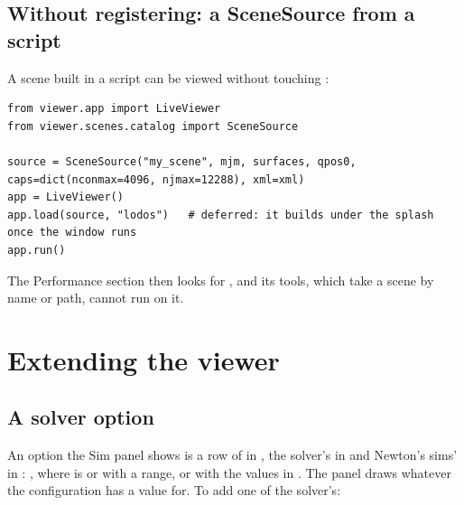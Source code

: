 \subsection{Without registering: a SceneSource from a script}\label{sec:noregister}

A scene built in a script can be viewed without touching :

\begin{lstlisting}
from viewer.app import LiveViewer
from viewer.scenes.catalog import SceneSource

source = SceneSource("my_scene", mjm, surfaces, qpos0, caps=dict(nconmax=4096, njmax=12288), xml=xml)
app = LiveViewer()
app.load(source, "lodos")   # deferred: it builds under the splash once the window runs
app.run()
\end{lstlisting}

The Performance section then looks for , and its tools, which take a scene by name or path, cannot run on it.

\section{Extending the viewer}\label{sec:extend}

\subsection{A solver option}\label{sec:newoption}

An option the Sim panel shows is a row of  in , the solver's in  and Newton's sims' in : , where  is  or  with a range, or  with the values in . The panel draws whatever the configuration has a value for. To add one of the solver's:

